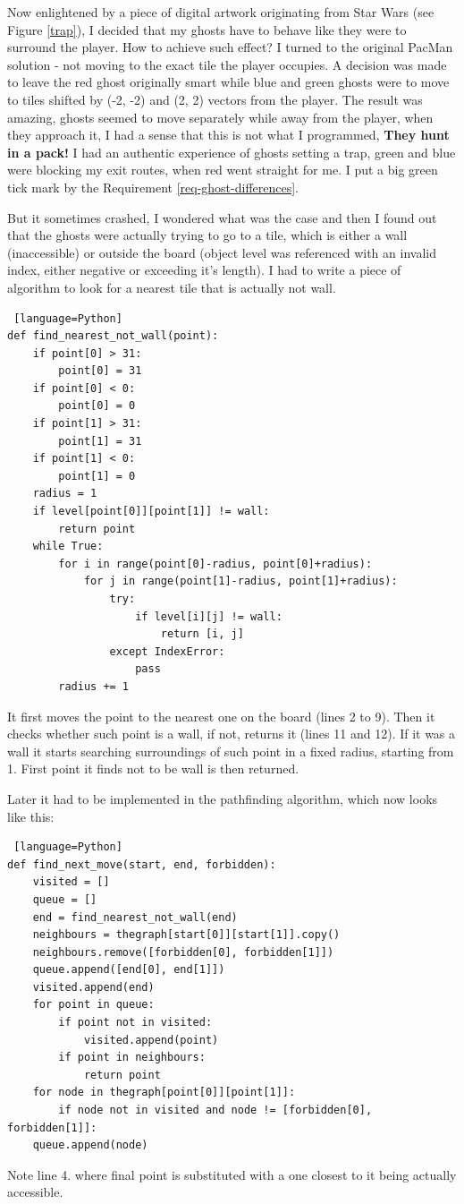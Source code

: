 \documentclass[11pt,a4paper,notitlepage]{report}
\begin{document}
					Now enlightened by a piece of digital artwork originating from Star Wars (see Figure \ref{trap}), I decided that my ghosts have to behave like they were to surround the player. How to achieve such effect? I turned to the original PacMan solution - not moving to the exact tile the player occupies. A decision was made to leave the red ghost originally smart while blue and green ghosts were to move to tiles shifted by (-2, -2) and (2, 2) vectors from the player. The result was amazing, ghosts seemed to move separately while away from the player, when they approach it, I had a sense that this is not what I programmed, \textbf{They hunt in a pack!} I had an authentic experience of ghosts setting a trap, green and blue were blocking my exit routes, when red went straight for me. I put a big green tick mark by the Requirement \ref{req-ghost-differences}.
					
					But it sometimes crashed, I wondered what was the case and then I found out that the ghosts were actually trying to go to a tile, which is either a wall (inaccessible) or outside the board (object level was referenced with an invalid index, either negative or exceeding it's length). I had to write a piece of algorithm to look for a nearest tile that is actually not wall.
					
					\begin{lstlisting} [language=Python]
def find_nearest_not_wall(point):
    if point[0] > 31:
        point[0] = 31
    if point[0] < 0:
        point[0] = 0
    if point[1] > 31:
        point[1] = 31
    if point[1] < 0:
        point[1] = 0
    radius = 1
    if level[point[0]][point[1]] != wall:
        return point
    while True:
        for i in range(point[0]-radius, point[0]+radius):
            for j in range(point[1]-radius, point[1]+radius):
                try:
                    if level[i][j] != wall:
                        return [i, j]
                except IndexError:
                    pass
        radius += 1
					\end{lstlisting}
					It first moves the point to the nearest one on the board (lines 2 to 9). Then it checks whether such point is a wall, if not, returns it (lines 11 and 12). If it was a wall it starts searching surroundings of such point in a fixed radius, starting from 1. First point it finds not to be wall is then returned.
					
					Later it had to be implemented in the pathfinding algorithm, which now looks like this:
					\begin{lstlisting} [language=Python]
def find_next_move(start, end, forbidden):
    visited = []
    queue = []
    end = find_nearest_not_wall(end)
    neighbours = thegraph[start[0]][start[1]].copy()
    neighbours.remove([forbidden[0], forbidden[1]])
    queue.append([end[0], end[1]])
    visited.append(end)
    for point in queue:
        if point not in visited:
            visited.append(point)
        if point in neighbours:
            return point
    for node in thegraph[point[0]][point[1]]:
        if node not in visited and node != [forbidden[0], forbidden[1]]:
    queue.append(node)
					\end{lstlisting}
					Note line 4. where final point is substituted with a one closest to it being actually accessible.
					
\end{document}
